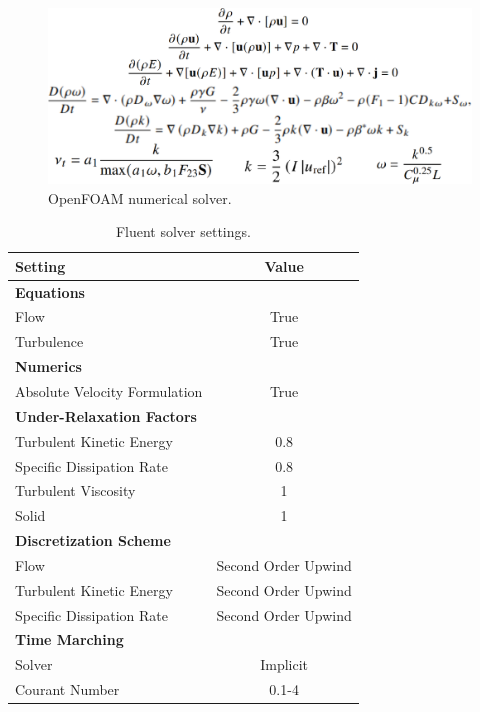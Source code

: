 \documentclass[12pt]{article}
\begin{document}
\begin{figure}[H]
    \centering
    \includegraphics[width=\linewidth]{figs/of_solver.png}
    \caption{OpenFOAM numerical solver.}
    \label{fig:OF}
\end{figure}

\begin{table}[H]
\centering
\caption{Fluent solver settings.}
\label{tab:solver_settings}
\begin{tabular}{|l|c|}
\hline
\textbf{Setting} & \textbf{Value} \\ \hline
\textbf{Equations} & \\ \hline
Flow & True \\
Turbulence & True \\ \hline
\textbf{Numerics} & \\ \hline
Absolute Velocity Formulation & True \\ \hline
\textbf{Under-Relaxation Factors} & \\ \hline
Turbulent Kinetic Energy & 0.8 \\
Specific Dissipation Rate & 0.8 \\
Turbulent Viscosity & 1 \\
Solid & 1 \\ \hline
\textbf{Discretization Scheme} & \\ \hline
Flow & Second Order Upwind \\
Turbulent Kinetic Energy & Second Order Upwind \\
Specific Dissipation Rate & Second Order Upwind \\ \hline
\textbf{Time Marching} & \\ \hline
Solver & Implicit \\
Courant Number & 0.1-4 \\ \hline
\end{tabular}
\end{table}
\end{document}
